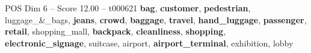 \begin{textsample}{POS Dim 6 – Score 12.00 – t000621}  \label{ex:f6_pos_030}
\textbf{bag}, \textbf{customer}, \textbf{pedestrian}, luggage\_\&\_bags, \textbf{jeans}, \textbf{crowd}, \textbf{baggage}, \textbf{travel}, \textbf{hand\_luggage}, \textbf{passenger}, \textbf{retail}, shopping\_mall, \textbf{backpack}, \textbf{cleanliness}, \textbf{shopping}, \textbf{electronic\_signage}, suitcase, airport, \textbf{airport\_terminal}, exhibition, lobby

\end{textsample}
